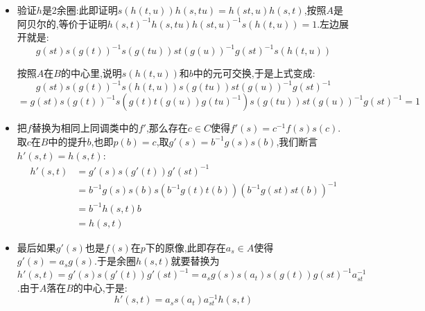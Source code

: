 \begin{enumerate}
	\begin{itemize}
		\item 验证$h$是2余圈:此即证明$s(h(t,u))h(s,tu)=h(st,u)h(s,t)$,按照$A$是阿贝尔的,等价于证明$h(s,t)^{-1}h(s,tu)h(st,u)^{-1}s(h(t,u))=1$.左边展开就是:
		$$g(st)s(g(t))^{-1}s(g(tu))st(g(u))^{-1}g(st)^{-1}s(h(t,u))$$
		
		按照$A$在$B$的中心里,说明$s(h(t,u))$和$b$中的元可交换,于是上式变成:
		$$g(st)s(g(t))^{-1}s(h(t,u))s(g(tu))st(g(u))^{-1}g(st)^{-1}$$
		$$=g(st)s(g(t))^{-1}s\left(g(t)t(g(u))g(tu)^{-1}\right)s(g(tu))st(g(u))^{-1}g(st)^{-1}=1$$
		\item 把$f$替换为相同上同调类中的$f'$,那么存在$c\in C$使得$f'(s)=c^{-1}f(s)s(c)$.取$c$在$B$中的提升$b$,也即$p(b)=c$,取$g'(s)=b^{-1}g(s)s(b)$,我们断言$h'(s,t)=h(s,t)$:
		\begin{align*}
			h'(s,t)&=g'(s)s(g'(t))g'(st)^{-1}\\&=b^{-1}g(s)s(b)s(b^{-1}g(t)t(b))(b^{-1}g(st)st(b))^{-1}\\&=b^{-1}h(s,t)b\\&=h(s,t)
		\end{align*}
		\item 最后如果$g'(s)$也是$f(s)$在$p$下的原像,此即存在$a_s\in A$使得$g'(s)=a_sg(s)$.于是余圈$h(s,t)$就要替换为$h'(s,t)=g'(s)s(g'(t))g'(st)^{-1}=a_sg(s)s(a_t)s(g(t))g(st)^{-1}a_{st}^{-1}$.由于$A$落在$B$的中心,于是:
		$$h'(s,t)=a_ss(a_t)a_{st}^{-1}h(s,t)$$
		

\end{itemize}
\end{enumerate}
